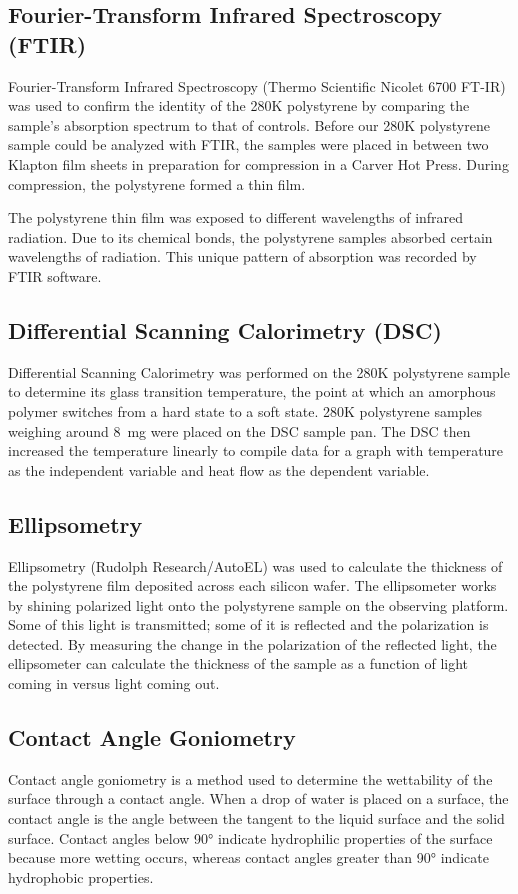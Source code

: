 \documentclass[twocolumn]{article}
\begin{document}
            \subsection{Fourier-Transform Infrared Spectroscopy (FTIR)}
                Fourier-Transform Infrared Spectroscopy (Thermo Scientific Nicolet 6700 FT-IR) was used to confirm the identity of the 280K polystyrene by comparing the sample's absorption spectrum to that of controls. Before our 280K polystyrene sample could be analyzed with FTIR, the samples were placed in between two Klapton film sheets in preparation for compression in a Carver Hot Press. During compression, the polystyrene formed a thin film. 

                The polystyrene thin film was exposed to different wavelengths of infrared radiation. Due to its chemical bonds, the polystyrene samples absorbed certain wavelengths of radiation. This unique pattern of absorption was recorded by FTIR software.

            \subsection{Differential Scanning Calorimetry (DSC)}
                Differential Scanning Calorimetry was performed on the 280K polystyrene sample to determine its glass transition temperature, the point at which an amorphous polymer switches from a hard state to a soft state. 280K polystyrene samples weighing around \qty{8}{\milli\gram} were placed on the DSC sample pan. The DSC then increased the temperature linearly to compile data for a graph with temperature as the independent variable and heat flow as the dependent variable.

            \subsection{Ellipsometry}
                Ellipsometry (Rudolph Research/AutoEL) was used to calculate the thickness of the polystyrene film deposited across each silicon wafer. The ellipsometer works by shining polarized light onto the polystyrene sample on the observing platform. Some of this light is transmitted; some of it is reflected and the polarization is detected. By measuring the change in the polarization of the reflected light, the ellipsometer can calculate the thickness of the sample as a function of light coming in versus light coming out.

            \subsection{Contact Angle Goniometry}
                Contact angle goniometry is a method used to determine the wettability of the surface through a contact angle. When a drop of water is placed on a surface, the contact angle is the angle between the tangent to the liquid surface and the solid surface. Contact angles below 90° indicate hydrophilic properties of the surface because more wetting occurs, whereas contact angles greater than 90° indicate hydrophobic properties.
                
\end{document}
